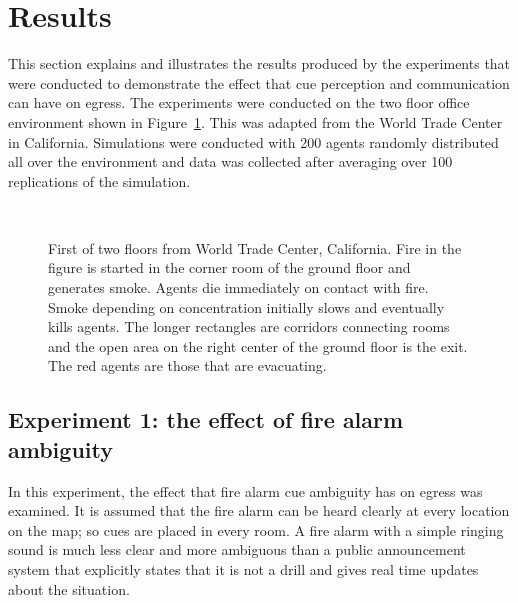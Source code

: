 



\section{Results}
\label{PreEvac:Results}

This section explains and illustrates the results produced by the experiments that were conducted to demonstrate the effect that cue perception and communication can have on egress. The experiments were conducted on the two floor office environment shown in Figure~\ref{fig:layout}. This was adapted from the World Trade Center in California.  Simulations were conducted with 200 agents randomly distributed all over the environment and data was collected after averaging over 100 replications of the simulation.

\begin{figure}[!tb]
\centering
{}
\\
\caption[The Environment Layout]{First of two floors from World Trade Center, California. Fire in the figure is started in the corner room of the ground floor and generates smoke. Agents die immediately on contact with fire. Smoke depending on concentration initially slows and eventually kills agents. The longer rectangles are corridors connecting rooms and the open area on the right center of the ground floor is the exit. The red agents are those that are evacuating.}
\label{fig:layout}
\end{figure}


\subsection{Experiment 1: the effect of fire alarm ambiguity}
\label{PreEvac:experiment1}

In this experiment, the effect that fire alarm cue ambiguity has on egress was examined. It is assumed that the fire alarm can be heard clearly at every location on the map; so cues are placed in every room. A fire alarm with a simple ringing sound is much less clear and more ambiguous than a public announcement system that explicitly states that it is not a drill and gives real time updates about the situation.

